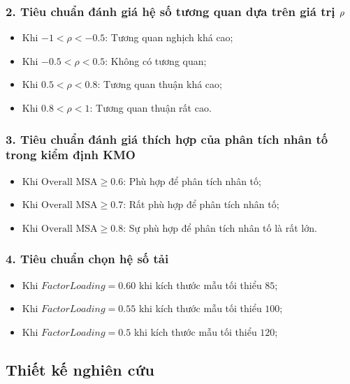 \documentclass[../thesis.tex]{subfiles}
\begin{document}
\subsubsection{2. Tiêu chuẩn đánh giá hệ số tương quan dựa trên giá trị $ \bf\rho $}

\begin{itemize}
	\item Khi $ -1 < \rho < -0.5 $: Tương quan nghịch khá cao; 
	\item Khi $ -0.5 < \rho < 0.5 $: Không có tương quan; 
	\item Khi $ 0.5 < \rho < 0.8 $: Tương quan thuận khá cao; 
	\item Khi $ 0.8 < \rho < 1 $: Tương quan thuận rất cao.
\end{itemize}

\subsubsection{3. Tiêu chuẩn đánh giá thích hợp của phân tích nhân tố trong kiểm định KMO}

\begin{itemize}
	\item Khi $ \text{Overall MSA} \geq 0.6 $: Phù hợp để phân tích nhân tố; 
	\item Khi $ \text{Overall MSA} \geq 0.7 $: Rất phù hợp để phân tích nhân tố; 
	\item Khi $ \text{Overall MSA} \geq 0.8 $: Sự phù hợp để phân tích nhân tố là rất lớn.
\end{itemize}

\subsubsection{4. Tiêu chuẩn chọn hệ số tải}
\begin{itemize}
	\item Khi $ Factor Loading =  0.60 $ khi kích thước mẫu tối thiểu $ 85 $; 
	\item Khi $ Factor Loading =  0.55 $ khi kích thước mẫu tối thiểu $ 100 $;  
	\item Khi $ Factor Loading =  0.5 $ khi kích thước mẫu tối thiểu $ 120 $; 
\end{itemize}

\newpage
\subsection{Thiết kế nghiên cứu}
\end{document}
